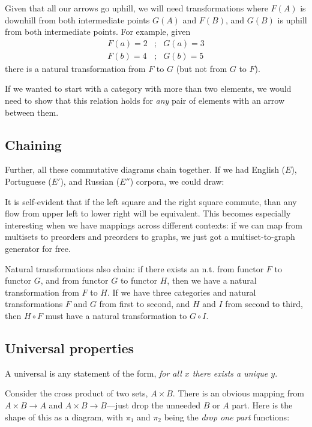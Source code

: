 \documentclass[11pt]{article}
\begin{document}
Given that all our arrows go uphill, we will need transformations where $F(A)$ is downhill
from both intermediate points $G(A)$ and $F(B)$, and $G(B)$ is uphill from both
intermediate points. For example, given
\begin{eqnarray*}
    F(a) = 2 &;& G(a) = 3\\
    F(b) = 4 &;& G(b) = 5
\end{eqnarray*} 
there is a natural transformation from $F$ to $G$ (but not from $G$ to $F$).

If we wanted to start with a category with more than two elements, we would need to show
that this relation holds for {\em any} pair of elements with an arrow between them.

\subsection{Chaining}
Further, all these commutative diagrams chain together. If we had English ($E$), Portuguese ($E'$), and
Russian  ($E''$) corpora, we could draw:


It is self-evident that if the left square and the right square commute, than any flow
from upper left to lower right will be equivalent. This becomes especially interesting
when we have mappings across different contexts: if we can map from multisets to preorders
and preorders to graphs, we just got a multiset-to-graph generator for free.

Natural transformations also chain: if there exists an n.t. from functor $F$ to functor
$G$, and from functor $G$ to functor $H$, then we have a natural transformation from $F$
to $H$. If we have three categories and natural transformations $F$ and $G$ from first to
second, and $H$ and $I$ from second to third, then $H\circ F$ must have a natural
transformation to $G\circ I$.

\subsection{Universal properties}
A universal is any statement of the form, {\em for all $x$ there exists a unique $y$}.

Consider the cross product of two sets, $A\times B$. There is an obvious mapping from
$A\times B \to A$ and $A\times B \to B$---just drop the unneeded $B$ or $A$ part. Here
is the shape of this as a diagram, with $\pi_1$ and $\pi_2$ being the {\em drop one
part} functions:
\end{document}
